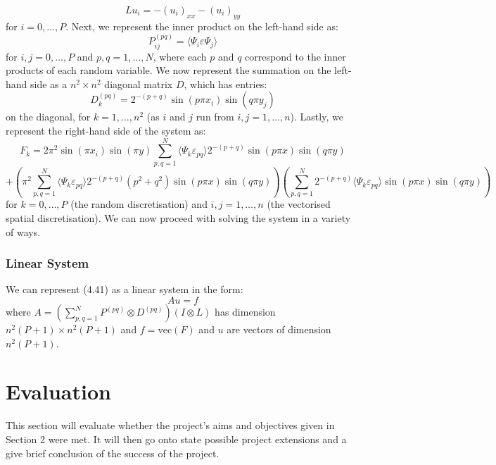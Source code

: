 \documentclass[11pt]{article}
\numberwithin{equation}{section}
\begin{document}
\begin{equation}
Lu_i = - (u_i)_{xx} - (u_i)_{yy}
\end{equation}
for $i=0,\dots,P$. Next, we represent the inner product on the left-hand side as:
\begin{equation}
P_{ij}^{(pq)} = \langle \Psi_i \varepsilon \Psi_j \rangle
\end{equation}
for $i,j=0,\dots,P$ and $p,q=1,\dots,N$, where each $p$ and $q$ correspond to the inner products of each random variable. We now represent the summation on the left-hand side as a $n^2 \times n^2$ diagonal matrix $D$, which has entries:
\begin{equation}
D_k^{(pq)} = 2^{-(p+q)} \sin(p \pi x_i) \sin(q \pi y_j)
\end{equation}
on the diagonal, for $k=1,\dots,n^2$ (as $i$ and $j$ run from $i,j=1,\dots,n$). Lastly, we represent the right-hand side of the system as:
\begin{equation}
F_k = 2 \pi^2 \sin(\pi x_i) \sin(\pi y) \sum_{p,q=1}^N \langle \Psi_k \varepsilon_{pq} \rangle 2^{-(p+q)} \sin(p \pi x)\sin(q \pi y) \nonumber
\end{equation}
\begin{equation}
+ \left(\pi^2 \sum_{p,q=1}^N \langle \Psi_k \varepsilon_{pq} \rangle 2^{-(p+q)} (p^2 + q^2) \sin(p \pi x)\sin(q \pi y) \right) \left(\sum_{p,q=1}^N 2^{-(p+q)} \langle \Psi_k \varepsilon_{pq} \rangle \sin(p \pi x)\sin(q \pi y) \right)
\end{equation}
for $k=0,\dots,P$ (the random discretisation) and $i,j=1,\dots,n$ (the vectorised spatial discretisation). We can now proceed with solving the system in a variety of ways.

\subsubsection*{Linear System}
We can represent (4.41) as a linear system in the form:
\begin{equation}
Au = f
\end{equation}
where $A=\left( \sum_{p,q=1}^N P^{(pq)} \otimes D^{(pq)} \right) \left( I \otimes L \right)$ has dimension $n^2(P+1) \times n^2(P+1)$ and $f = \text{vec}(F)$ and $u$ are vectors of dimension $n^2(P+1)$.

\newpage

\section{Evaluation}
This section will evaluate whether the project's aims and objectives given in Section 2 were met. It will then go onto state possible project extensions and a give brief conclusion of the success of the project.
\end{document}
